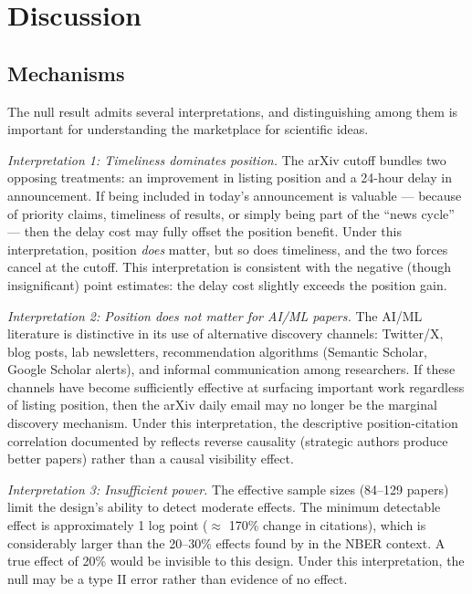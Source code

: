 \documentclass[12pt]{article}
\begin{document}
\section{Discussion}

\subsection{Mechanisms}

The null result admits several interpretations, and distinguishing among them is important for understanding the marketplace for scientific ideas.

\textit{Interpretation 1: Timeliness dominates position.} The arXiv cutoff bundles two opposing treatments: an improvement in listing position and a 24-hour delay in announcement. If being included in today's announcement is valuable --- because of priority claims, timeliness of results, or simply being part of the ``news cycle'' --- then the delay cost may fully offset the position benefit. Under this interpretation, position \textit{does} matter, but so does timeliness, and the two forces cancel at the cutoff. This interpretation is consistent with the negative (though insignificant) point estimates: the delay cost slightly exceeds the position gain.

\textit{Interpretation 2: Position does not matter for AI/ML papers.} The AI/ML literature is distinctive in its use of alternative discovery channels: Twitter/X, blog posts, lab newsletters, recommendation algorithms (Semantic Scholar, Google Scholar alerts), and informal communication among researchers. If these channels have become sufficiently effective at surfacing important work regardless of listing position, then the arXiv daily email may no longer be the marginal discovery mechanism. Under this interpretation, the descriptive position-citation correlation documented by \citet{haque2009, haque2010} reflects reverse causality (strategic authors produce better papers) rather than a causal visibility effect.

\textit{Interpretation 3: Insufficient power.} The effective sample sizes (84--129 papers) limit the design's ability to detect moderate effects. The minimum detectable effect is approximately 1 log point ($\approx$ 170\% change in citations), which is considerably larger than the 20--30\% effects found by \citet{feenberg2017} in the NBER context. A true effect of 20\% would be invisible to this design. Under this interpretation, the null may be a type II error rather than evidence of no effect.
\end{document}
